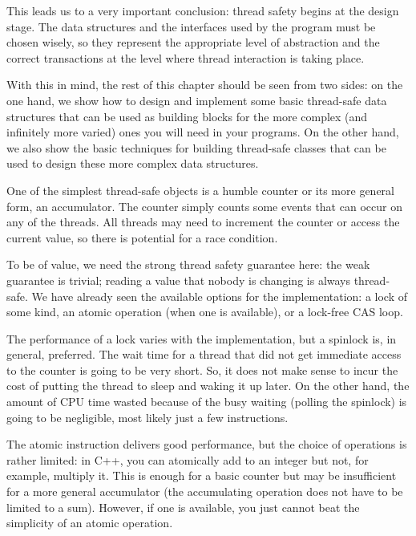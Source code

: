 This leads us to a very important conclusion: thread safety begins at the design stage. The data structures and the interfaces used by the program must be chosen wisely, so they represent the appropriate level of abstraction and the correct transactions at the level where thread interaction is taking place.

With this in mind, the rest of this chapter should be seen from two sides: on the one hand, we show how to design and implement some basic thread-safe data structures that can be used as building blocks for the more complex (and infinitely more varied) ones you will need in your programs. On the other hand, we also show the basic techniques for building thread-safe classes that can be used to design these more complex data structures.


One of the simplest thread-safe objects is a humble counter or its more general form, an accumulator. The counter simply counts some events that can occur on any of the threads. All threads may need to increment the counter or access the current value, so there is potential for a race condition. 

To be of value, we need the strong thread safety guarantee here: the weak guarantee is trivial; reading a value that nobody is changing is always thread-safe. We have already seen the available options for the implementation: a lock of some kind, an atomic operation (when one is available), or a lock-free CAS loop.

The performance of a lock varies with the implementation, but a spinlock is, in general, preferred. The wait time for a thread that did not get immediate access to the counter is going to be very short. So, it does not make sense to incur the cost of putting the thread to sleep and waking it up later. On the other hand, the amount of CPU time wasted because of the busy waiting (polling the spinlock) is going to be negligible, most likely just a few instructions.

The atomic instruction delivers good performance, but the choice of operations is rather limited: in C++, you can atomically add to an integer but not, for example, multiply it. This is enough for a basic counter but may be insufficient for a more general accumulator (the accumulating operation does not have to be limited to a sum). However, if one is available, you just cannot beat the simplicity of an atomic operation.

